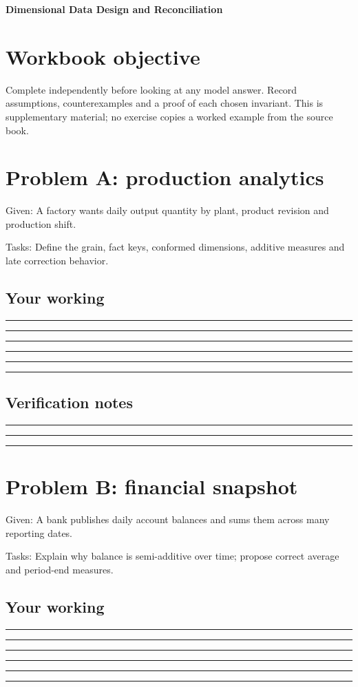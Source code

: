 \documentclass[11pt,letterpaper]{article}
\newcommand{\ResponseLine}{\par\vspace{1.05em}\noindent\rule{\linewidth}{0.4pt}\par}
\newcommand{\ResponseArea}{\ResponseLine\ResponseLine\ResponseLine}
\begin{document}
\begin{center}
{\LARGE\bfseries\color{navy} Dimensional Data Design and Reconciliation}\par
\vspace{0.25em}{\large Guided workbook | conceptual and operational analysis}\par
{}
\end{center}
\vspace{0.8em}
\section{Workbook objective}
Complete independently before looking at any model answer. Record assumptions, counterexamples and a proof of each chosen invariant. This is supplementary material; no exercise copies a worked example from the source book.


\section{Problem A: production analytics}
Given: A factory wants daily output quantity by plant, product revision and production shift.

Tasks: Define the grain, fact keys, conformed dimensions, additive measures and late correction behavior.

\subsection{Your working}
\ResponseArea\ResponseArea
\subsection{Verification notes}
\ResponseArea

\section{Problem B: financial snapshot}
Given: A bank publishes daily account balances and sums them across many reporting dates.

Tasks: Explain why balance is semi-additive over time; propose correct average and period-end measures.

\subsection{Your working}
\ResponseArea\ResponseArea
\end{document}
